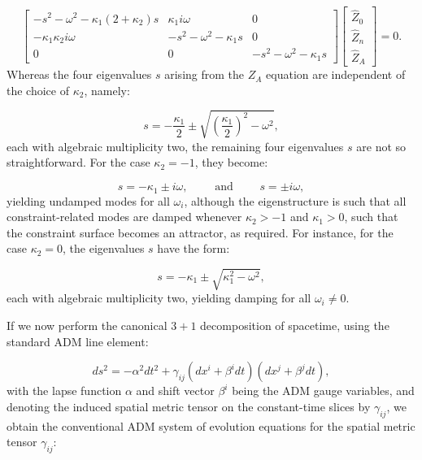 \documentclass{article}
\begin{document}
\begin{equation}
\begin{bmatrix}
-s^2 - \omega^2 - \kappa_1 \left( 2 + \kappa_2 \right) s & \kappa_1 i \omega & 0\\
- \kappa_1 \kappa_2 i \omega & -s^2 - \omega^2 - \kappa_1 s & 0\\
0 & 0 & -s^2 - \omega^2 - \kappa_1 s
\end{bmatrix} \begin{bmatrix}
\hat{Z}_0\\
\hat{Z}_n\\
\hat{Z}_A
\end{bmatrix} = 0.
\end{equation}
Whereas the four eigenvalues $s$ arising from the ${Z_A}$ equation are independent of the choice of ${\kappa_2}$, namely:

\begin{equation}
s = - \frac{\kappa_1}{2} \pm \sqrt{\left( \frac{\kappa_1}{2} \right)^2 - \omega^2},
\end{equation}
each with algebraic multiplicity two, the remaining four eigenvalues $s$ are not so straightforward. For the case ${\kappa_2 = -1}$, they become:

\begin{equation}
s = - \kappa_1 \pm i \omega, \qquad \text{ and } \qquad s = \pm i \omega,
\end{equation}
yielding undamped modes for all ${\omega_i}$, although the eigenstructure is such that all constraint-related modes are damped whenever ${\kappa_2 > -1}$ and ${\kappa_1 > 0}$, such that the constraint surface becomes an attractor, as required. For instance, for the case ${\kappa_2 = 0}$, the eigenvalues $s$ have the form:

\begin{equation}
s = - \kappa_1 \pm \sqrt{\kappa_{1}^{2} - \omega^2},
\end{equation}
each with algebraic multiplicity two, yielding damping for all ${\omega_i \neq 0}$.

If we now perform the canonical ${3 + 1}$ decomposition of spacetime, using the standard ADM line element\cite{arnowitt}:

\begin{equation}
d s^2 = - \alpha^2 d t^2 + \gamma_{i j} \left( d x^i + \beta^i d t \right) \left( d x^j + \beta^j d t \right),
\end{equation}
with the lapse function ${\alpha}$ and shift vector ${\beta^i}$ being the ADM gauge variables, and denoting the induced spatial metric tensor on the constant-time slices by ${\gamma_{i j}}$, we obtain the conventional ADM system of evolution equations for the spatial metric tensor ${\gamma_{i j}}$:
\end{document}
